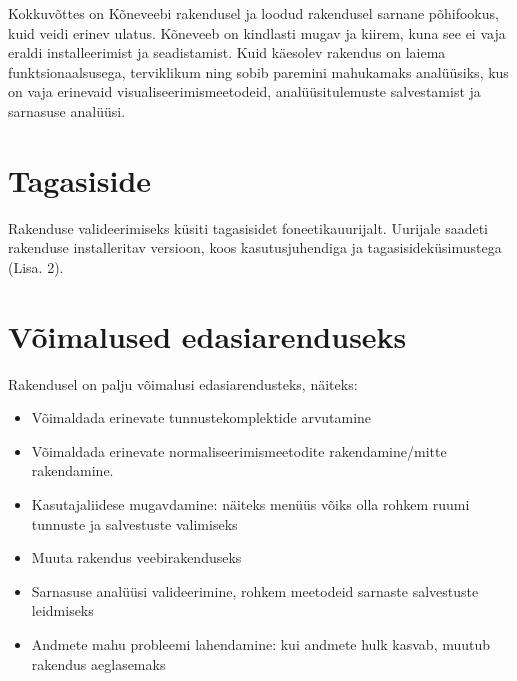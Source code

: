 Kokkuvõttes on Kõneveebi rakendusel ja loodud rakendusel sarnane põhifookus, kuid veidi erinev ulatus. Kõneveeb on kindlasti mugav ja kiirem, kuna see ei vaja eraldi installeerimist ja seadistamist. Kuid käesolev rakendus on laiema funktsionaalsusega, terviklikum ning sobib paremini mahukamaks analüüsiks, kus on vaja erinevaid visualiseerimismeetodeid, analüüsitulemuste salvestamist ja sarnasuse analüüsi.

\section{Tagasiside}
Rakenduse valideerimiseks küsiti tagasisidet foneetikauurijalt. Uurijale saadeti rakenduse installeritav versioon, koos kasutusjuhendiga ja tagasisideküsimustega (Lisa. 2).

\section{Võimalused edasiarenduseks}
Rakendusel on palju võimalusi edasiarendusteks, näiteks:
\begin{itemize}
    \item Võimaldada erinevate tunnustekomplektide arvutamine
    \item Võimaldada erinevate normaliseerimismeetodite rakendamine/mitte rakendamine.
    \item Kasutajaliidese mugavdamine: näiteks menüüs võiks olla rohkem ruumi tunnuste ja salvestuste valimiseks
    \item Muuta rakendus veebirakenduseks
    \item Sarnasuse analüüsi valideerimine, rohkem meetodeid sarnaste salvestuste leidmiseks
    \item Andmete mahu probleemi lahendamine: kui andmete hulk kasvab, muutub rakendus aeglasemaks
\end{itemize}

